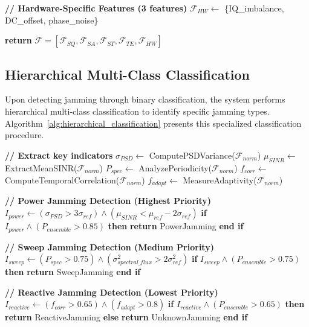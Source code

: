 \documentclass[journal]{IEEEtran}
\begin{document}
\begin{algorithm}[t]
\begin{algorithmic}[1]
\State \textbf{// Hardware-Specific Features (3 features)}
\State $\mathcal{F}_{HW} \leftarrow$ \{IQ\_imbalance, DC\_offset, phase\_noise\}

\State \textbf{return} $\mathcal{F} = [\mathcal{F}_{SQ}, \mathcal{F}_{SA}, \mathcal{F}_{ST}, \mathcal{F}_{TE}, \mathcal{F}_{HW}]$
\end{algorithmic}
\end{algorithm}

\subsection{Hierarchical Multi-Class Classification}

Upon detecting jamming through binary classification, the system performs hierarchical multi-class classification to identify specific jamming types. Algorithm~\ref{alg:hierarchical_classification} presents this specialized classification procedure.

\begin{algorithm}[t]
\caption{Hierarchical Jamming Type Classification}
\label{alg:hierarchical_classification}
\begin{algorithmic}[1]

\State \textbf{// Extract key indicators}
\State $\sigma_{PSD} \leftarrow$ ComputePSDVariance($\mathcal{F}_{norm}$)
\State $\mu_{SINR} \leftarrow$ ExtractMeanSINR($\mathcal{F}_{norm}$)
\State $P_{spec} \leftarrow$ AnalyzePeriodicity($\mathcal{F}_{norm}$)
\State $f_{corr} \leftarrow$ ComputeTemporalCorrelation($\mathcal{F}_{norm}$)
\State $f_{adapt} \leftarrow$ MeasureAdaptivity($\mathcal{F}_{norm}$)

\State \textbf{// Power Jamming Detection (Highest Priority)}
\State $I_{power} \leftarrow (\sigma_{PSD} > 3\sigma_{ref}) \land (\mu_{SINR} < \mu_{ref} - 2\sigma_{ref})$
\State \textbf{if} $I_{power} \land (P_{ensemble} > 0.85)$ \textbf{then}
\State \hspace{\algorithmicindent} \textbf{return} PowerJamming
\State \textbf{end if}

\State \textbf{// Sweep Jamming Detection (Medium Priority)}
\State $I_{sweep} \leftarrow (P_{spec} > 0.75) \land (\sigma^2_{spectral\_flux} > 2\sigma^2_{ref})$
\State \textbf{if} $I_{sweep} \land (P_{ensemble} > 0.75)$ \textbf{then}
\State \hspace{\algorithmicindent} \textbf{return} SweepJamming
\State \textbf{end if}

\State \textbf{// Reactive Jamming Detection (Lowest Priority)}
\State $I_{reactive} \leftarrow (f_{corr} > 0.65) \land (f_{adapt} > 0.8)$
\State \textbf{if} $I_{reactive} \land (P_{ensemble} > 0.65)$ \textbf{then}
\State \hspace{\algorithmicindent} \textbf{return} ReactiveJamming
\State \textbf{else}
\State \hspace{\algorithmicindent} \textbf{return} UnknownJamming 
\State \textbf{end if}
\end{algorithmic}
\end{algorithm}
\end{document}
